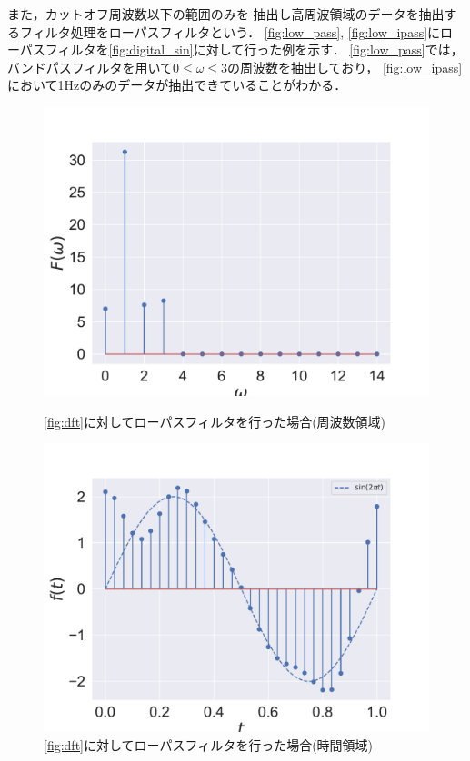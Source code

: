 また，カットオフ周波数以下の範囲のみを
抽出し高周波領域のデータを抽出するフィルタ処理をローパスフィルタという．
\autoref{fig:low_pass}, \autoref{fig:low_ipass}にローパスフィルタを\autoref{fig:digital_sin}に対して行った例を示す．
\autoref{fig:low_pass}では，バンドパスフィルタを用いて$0 \le \omega \le 3$の周波数を抽出しており，
\autoref{fig:low_ipass}において1Hzのみのデータが抽出できていることがわかる．

\iffigure
\begin{figure}[h]
  \begin{minipage}{.45\hsize}
    \centering
    \includegraphics[clip, width=\textwidth]{figure/low_pass_dft.pdf}
    \caption{\autoref{fig:dft}に対してローパスフィルタを行った場合(周波数領域)}
    \label{fig:low_pass}
  \end{minipage}
  \begin{minipage}{.45\hsize}
    \centering
    \includegraphics[clip, width=\textwidth]{figure/low_pass_idft.pdf}
    \caption{\autoref{fig:dft}に対してローパスフィルタを行った場合(時間領域)}
    \label{fig:low_ipass}
  \end{minipage}
\end{figure}
\fi
